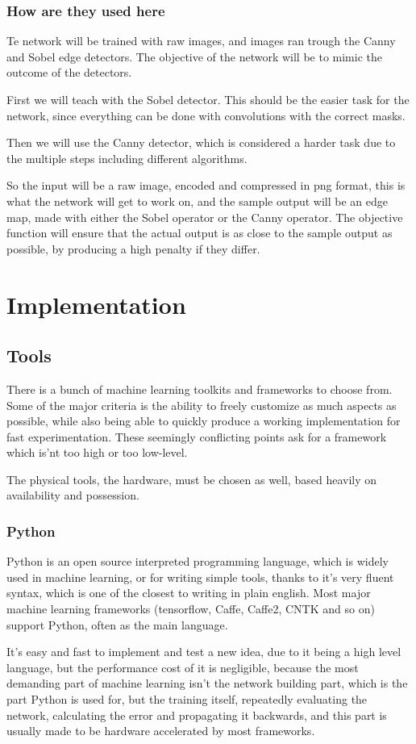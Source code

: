\documentclass[12pt]{report}
\begin{document}
\subsection{How are they used here}
Te network will be trained with raw images, and images ran trough the Canny and Sobel edge detectors. The objective of the network will be to mimic the outcome of the detectors.\par
First we will teach with the Sobel detector. This should be the easier task for the network, since everything can be done with convolutions with the correct masks.\par
Then we will use the Canny detector, which is considered a harder task due to the multiple steps including different algorithms.\par
So the input will be a raw image, encoded and compressed in png format, this is what the network will get to work on, and the sample output will be an edge map, made with either the Sobel operator or the Canny operator. The objective function will ensure that the actual output is as close to the sample output as possible, by producing a high penalty if they differ.
\chapter{Implementation}
\section{Tools}
There is a bunch of machine learning toolkits and frameworks to choose from. Some of the major criteria is the ability to freely customize as much aspects as possible, while also being able to quickly produce a working implementation for fast experimentation. These seemingly conflicting points ask for a framework which is'nt too high or too low-level.\par
The physical tools, the hardware, must be chosen as well, based heavily on availability and possession.
\subsection{Python}
Python is an open source interpreted programming language, which is widely used in machine learning, or for writing simple tools, thanks to it's very fluent syntax, which is one of the closest to writing in plain english. Most major machine learning frameworks (tensorflow, Caffe, Caffe2, CNTK and so on) support Python, often as the main language.\par
It's easy and fast to implement and test a new idea, due to it being a high level language, but the performance cost of it is negligible, because the most demanding part of machine learning isn't the network building part, which is the part Python is used for, but the training itself, repeatedly evaluating the network, calculating the error and propagating it backwards, and this part is usually made to be hardware accelerated by most frameworks.
\end{document}
